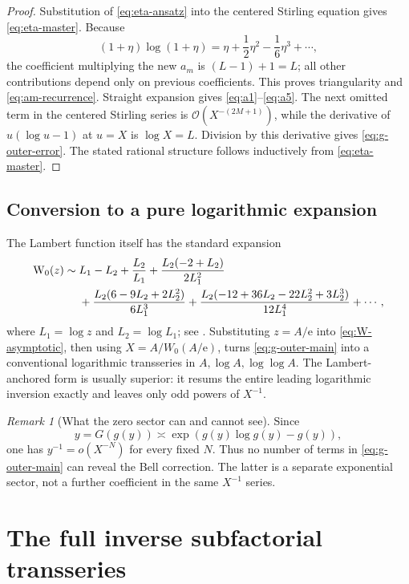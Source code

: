 \documentclass[11pt,oneside]{article}
\theoremstyle{plain}
\theoremstyle{definition}
\theoremstyle{remark}
\newtheorem{remark}[theorem]{Remark}
\newcommand{\ee}{\mathrm{e}}
\newcommand{\W}{\operatorname{W}}
\newcommand{\bigO}{\mathcal{O}}
\begin{document}
\begin{proof}
Substitution of \eqref{eq:eta-ansatz} into the centered Stirling equation gives
\eqref{eq:eta-master}.  Because
\[
 (1+\eta)\log(1+\eta)=\eta+\frac12\eta^2-\frac16\eta^3+\cdots,
\]
the coefficient multiplying the new \(a_m\) is
\((L-1)+1=L\); all other contributions depend only on previous coefficients.
This proves triangularity and \eqref{eq:am-recurrence}.  Straight expansion
gives \eqref{eq:a1}--\eqref{eq:a5}.  The next omitted term in the centered
Stirling series is \(\bigO(X^{-(2M+1)})\), while the derivative of
\(u(\log u-1)\) at \(u=X\) is \(\log X=L\).  Division by this derivative gives
\eqref{eq:g-outer-error}.  The stated rational structure follows inductively
from \eqref{eq:eta-master}.
\end{proof}

\subsection{Conversion to a pure logarithmic expansion}

The Lambert function itself has the standard expansion
\begin{align}
 \W_0(z)\sim{}&L_1-L_2+\frac{L_2}{L_1}
 +\frac{L_2(-2+L_2)}{2L_1^2}
 \notag\\
 &+\frac{L_2(6-9L_2+2L_2^2)}{6L_1^3}
 +\frac{L_2(-12+36L_2-22L_2^2+3L_2^3)}{12L_1^4}
 +\cdots,
 \label{eq:W-asymptotic}
\end{align}
where \(L_1=\log z\) and \(L_2=\log L_1\); see
\cite{Corless1996,DLMF4}.  Substituting \(z=A/\ee\) into
\eqref{eq:W-asymptotic}, then using \(X=A/W_0(A/\ee)\), turns
\eqref{eq:g-outer-main} into a conventional logarithmic transseries in
\(A,\log A,\log\log A\).  The Lambert-anchored form is usually superior: it
resums the entire leading logarithmic inversion exactly and leaves only odd
powers of \(X^{-1}\).

\begin{remark}[What the zero sector can and cannot see]
\label{rem:zero-sector-blindness}
Since
\[
 y=G(g(y))\asymp \exp(g(y)\log g(y)-g(y)),
\]
one has \(y^{-1}=o(X^{-N})\) for every fixed \(N\).  Thus no number of terms in
\eqref{eq:g-outer-main} can reveal the Bell correction.  The latter is a
separate exponential sector, not a further coefficient in the same
\(X^{-1}\) series.
\end{remark}

\section{The full inverse subfactorial transseries}
\label{sec:full-transseries}
\end{document}
